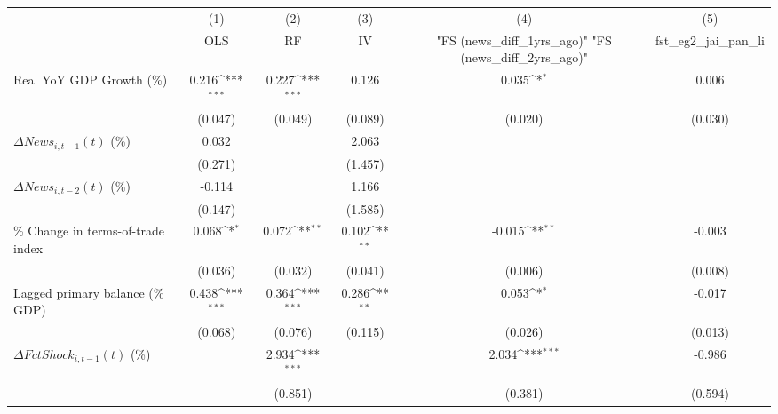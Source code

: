 {
\def\sym#1{\ifmmode^{#1}\else\(^{#1}\)\fi}
\begin{tabular}{l*{5}{c}}
\toprule
                    &\multicolumn{1}{c}{(1)}&\multicolumn{1}{c}{(2)}&\multicolumn{1}{c}{(3)}&\multicolumn{1}{c}{(4)}&\multicolumn{1}{c}{(5)}\\
                    &\multicolumn{1}{c}{OLS}&\multicolumn{1}{c}{RF}&\multicolumn{1}{c}{IV}&\multicolumn{1}{c}{ "FS (news_diff_1yrs_ago)"  "FS (news_diff_2yrs_ago)" }&\multicolumn{1}{c}{fst_eg2_jai_pan_li}\\
\midrule
Real YoY GDP Growth (\%)&       0.216\sym{***}&       0.227\sym{***}&       0.126         &       0.035\sym{*}  &       0.006         \\
                    &     (0.047)         &     (0.049)         &     (0.089)         &     (0.020)         &     (0.030)         \\
\addlinespace
$ \Delta News_{i,t-1}(t)$ (\%)&       0.032         &                     &       2.063         &                     &                     \\
                    &     (0.271)         &                     &     (1.457)         &                     &                     \\
\addlinespace
$ \Delta News_{i,t-2}(t)$ (\%)&      -0.114         &                     &       1.166         &                     &                     \\
                    &     (0.147)         &                     &     (1.585)         &                     &                     \\
\addlinespace
\% Change in terms-of-trade index&       0.068\sym{*}  &       0.072\sym{**} &       0.102\sym{**} &      -0.015\sym{**} &      -0.003         \\
                    &     (0.036)         &     (0.032)         &     (0.041)         &     (0.006)         &     (0.008)         \\
\addlinespace
Lagged primary balance (\% GDP)&       0.438\sym{***}&       0.364\sym{***}&       0.286\sym{**} &       0.053\sym{*}  &      -0.017         \\
                    &     (0.068)         &     (0.076)         &     (0.115)         &     (0.026)         &     (0.013)         \\
\addlinespace
$ \Delta FctShock_{i,t-1}(t)$ (\%)&                     &       2.934\sym{***}&                     &       2.034\sym{***}&      -0.986         \\
                    &                     &     (0.851)         &                     &     (0.381)         &     (0.594)         \\

\end{tabular}}
